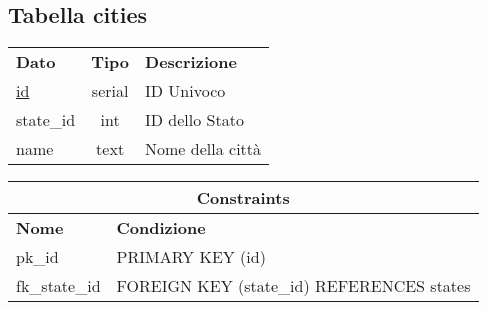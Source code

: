 \begin{center}
    \subsection*{Tabella \textnormal{cities}}
    
    \begin{tabularx}{\textwidth}{l c X}
        \toprule
        \textbf{Dato} & \textbf{Tipo} & \textbf{Descrizione}\\
        \underline{id} & serial & ID Univoco \\
        state\_id & int & ID dello Stato\\
        name & text & Nome della citt\`a\\
        \midrule
    \end{tabularx}
    \begin{tabularx}{\textwidth}{l X}
        \multicolumn{2}{c}{\textbf{Constraints}}\\
        \midrule
        \textbf{Nome} & \textbf{Condizione}\\
        pk\_id & PRIMARY KEY (id)\\
        fk\_state\_id & FOREIGN KEY (state\_id) REFERENCES states\\
        \bottomrule
    \end{tabularx}
    \bigskip
\end{center}

